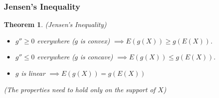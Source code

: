 \documentclass[12pt]{article}
\newtheorem{thm}{Theorem}[section]
\theoremstyle{definition}
\begin{document}

\subsubsection{Jensen's Inequality}


\begin{thm}
  (Jensen's Inequality)
  \begin{itemize}
    \item $g'' \geq 0$ everywhere ($g$ is convex) $\implies E(g(X)) \geq g(E(X))$. 
    \item $g'' \leq 0$ everywhere ($g$ is concave) $\implies E(g(X)) \leq g(E(X))$. 
    \item $g$ is linear $\implies E(g(X)) = g(E(X))$
  \end{itemize}
  (The properties need to hold only on the support of $X$)
\end{thm}

\end{document}
